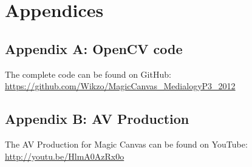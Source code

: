 \chapter{Appendices}
\section{Appendix A: OpenCV code}\label{appendixCode}
%

The complete code can be found on GitHub: \url{https://github.com/Wikzo/MagicCanvas_MedialogyP3_2012}

\section{Appendix B: AV Production}
The AV Production for Magic Canvas can be found on YouTube: \url{http://youtu.be/HlmA0AzRx0o}